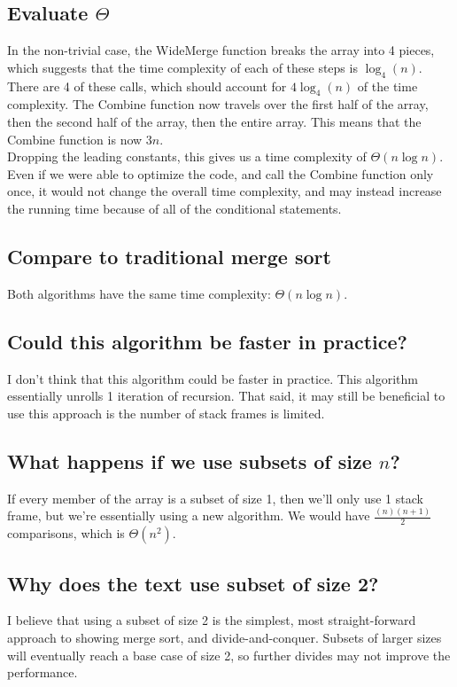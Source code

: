 \documentclass{article}
\begin{document}
\subsection{Evaluate \(\Theta\)}
In the non-trivial case, the WideMerge function breaks the array into 4 pieces, which suggests that the time complexity of each of these steps is \(\log_4(n)\).
There are 4 of these calls, which should account for \(4\log_4(n)\) of the time complexity.
The Combine function now travels over the first half of the array, then the second half of the array, then the entire array.
This means that the Combine function is now \(3n\). \\
Dropping the leading constants, this gives us a time complexity of \(\Theta(n \log n)\). \\
Even if we were able to optimize the code, and call the Combine function only once, it would not change the overall time complexity, and may instead increase the running time because of all of the conditional statements.
\subsection{Compare to traditional merge sort}
Both algorithms have the same time complexity: \(\Theta(n \log n)\).
\subsection{Could this algorithm be faster in practice?}
I don't think that this algorithm could be faster in practice.
This algorithm essentially unrolls 1 iteration of recursion.
That said, it may still be beneficial to use this approach is the number of stack frames is limited.
\subsection{What happens if we use subsets of size \(n\)?}
If every member of the array is a subset of size 1, then we'll only use 1 stack frame, but we're essentially using a new algorithm.
We would have \(\frac{(n)(n+1)}{2}\) comparisons, which is \(\Theta(n^2)\).
\subsection{Why does the text use subset of size 2?}
I believe that using a subset of size 2 is the simplest, most straight-forward approach to showing merge sort, and divide-and-conquer.
Subsets of larger sizes will eventually reach a base case of size 2, so further divides may not improve the performance.
\end{document}
